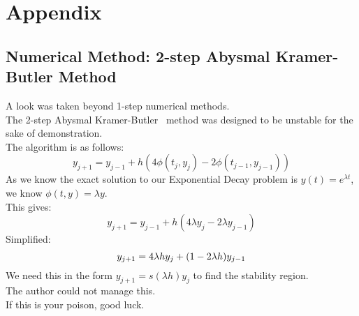 \section{Appendix}
\subsection{Numerical Method: 2-step Abysmal Kramer-Butler Method}
A look was taken beyond 1-step numerical methods.\\
The 2-step Abysmal Kramer-Butler~\cite{abysmal} method was designed to be unstable for the sake of demonstration.\\
The algorithm is as follows:
\[y_{j+1} = y_{j-1} + h(4\phi(t_j,y_j)-2\phi(t_{j-1},y_{j-1}))\]
As we know the exact solution to our Exponential Decay problem is $y(t) = e^{\lambda t}$, we know $\phi(t,y) = \lambda y$.\\
This gives:\\
\[y_{j+1} = y_{j-1} + h(4\lambda y_j - 2\lambda y_{j-1})\]
Simplified:\\
\[y_{j+1} = 4\lambda h y_j + (1-2\lambda h) y_{j-1}\]
We need this in the form $y_{j+1} = s(\lambda h)y_j$ to find the stability region.\\
The author could not manage this.\\
If this is your poison, good luck.\\

